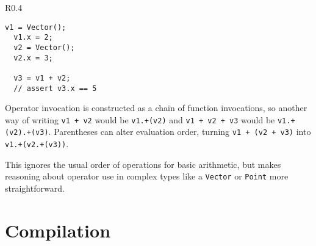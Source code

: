 \begin{wrapfigure}{R}{0.4\textwidth}
\begin{lstlisting}[language=Kale,caption=Operator use in Kale,label=kaleOperatorsUse]
  v1 = Vector();
  v1.x = 2;
  v2 = Vector();
  v2.x = 3;
  
  v3 = v1 + v2;
  // assert v3.x == 5
\end{lstlisting}
\end{wrapfigure}

Operator invocation is constructed as a chain of function invocations, so another way of writing \texttt{v1 + v2} would be \texttt{v1.+(v2)} and \texttt{v1 + v2 + v3} would be \texttt{v1.+(v2).+(v3)}.  Parentheses can alter evaluation order, turning \texttt{v1 + (v2 + v3)} into \texttt{v1.+(v2.+(v3))}.

This ignores the usual order of operations for basic arithmetic, but makes reasoning about operator use in complex types like a \texttt{Vector} or \texttt{Point} more straightforward.

\begin{comment}
\subsection{Pointers}

\begin{lstlisting}[language=Kale,caption=Pointers in Kale,label=kalePointers1]
  package test
  type Person {
    name string;
    getName() string {
      return this.name;
    }
  }
  extractName( p Person ) string {
    return p.name;
  }
  main() {
    person = Person();
    person.name = "John";
    extractName( &(person) ); // returns "John"
    &(person.name);           // pointer to "John"
    &(person.getName);        // MethodHandle (Person)Ljava/lang/String;
  }
\end{lstlisting}

With garbage collection, stack vs heap allocation is not an issue.  A pointer can safely be passed to external code



\subsection{Control Structures}

if/else

while

\end{comment}

\section{Compilation}

